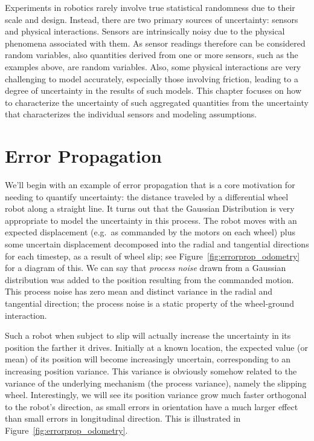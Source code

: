 Experiments in robotics rarely involve true statistical randomness due to their scale and design. Instead, there are two primary sources
of uncertainty: sensors and physical interactions. Sensors are intrinsically noisy due to the physical phenomena associated with them.
As sensor readings therefore can be considered random variables, also quantities derived from one or more sensors, such as the examples
above, are random variables. Also, some physical interactions are very challenging to model accurately, especially those involving
friction, leading to a degree of uncertainty in the results of such models. This chapter focuses on how to characterize the uncertainty
of such aggregated quantities from the uncertainty that characterizes the individual sensors and modeling assumptions.

\section{Error Propagation}\label{sec:errorprop}
We'll begin with an example of error propagation that is a core motivation for needing to quantify uncertainty: the distance traveled by a
differential wheel robot along a straight line. It turns out that the Gaussian Distribution is very appropriate to model the uncertainty in this process. The robot moves with an expected displacement (e.g.\ as commanded by the motors on each wheel) plus some uncertain displacement decomposed into the radial and tangential directions for each timestep, as a result of wheel slip; see Figure~\ref{fig:errorprop_odometry} for a diagram of this. We can say that \emph{process noise} drawn from a Gaussian distribution was added to the position resulting from the commanded motion. This process noise has zero mean and distinct variance in the radial and tangential direction; the process noise is a static property of the wheel-ground interaction.

Such a robot when subject to slip will actually increase the uncertainty in its position the farther it drives. Initially at a known location, the expected value (or mean) of its position will become increasingly uncertain, corresponding to an increasing position variance. This variance is obviously somehow related to the variance of the underlying mechanism (the process variance), namely the slipping wheel. Interestingly, we will see its position variance grow much faster orthogonal to the robot's direction, as small errors in orientation have a much larger effect than small errors in longitudinal direction. This is illustrated in Figure~\ref{fig:errorprop_odometry}.

